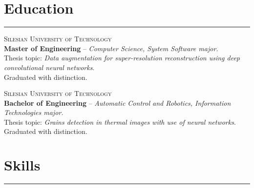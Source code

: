 \documentclass{article}
\begin{document}
\section*{Education}

\hrule \medskip

\textsc{Silesian University of Technology} \\
\textbf{Master of Engineering} -- \textit{Computer Science, System Software major.} \\
Thesis topic: \textit{Data augmentation for super-resolution reconstruction using deep convolutional neural networks}. \\
Graduated with distinction.

\medskip
{}
\noindent
\textsc{Silesian University of Technology} \\
\textbf{Bachelor of Engineering} -- \textit{Automatic Control and Robotics, Information Technologies major.} \\
Thesis topic: \textit{Grains detection in thermal images with use of neural networks}. \\
Graduated with distinction.

\section*{Skills}

\hrule \medskip
\end{document}
